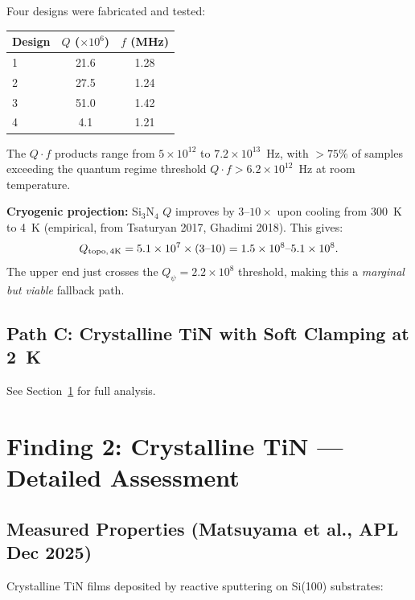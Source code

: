 \documentclass[11pt]{article}
\theoremstyle{definition}
\theoremstyle{remark}
\newcommand{\ee}[1]{\times 10^{#1}}
\newcommand{\Qpsi}{Q_\psi}
\begin{document}
Four designs were fabricated and tested:
\begin{center}
\begin{tabular}{lcc}
\toprule
Design & $Q$ ($\times 10^6$) & $f$ (MHz) \\
\midrule
1 & 21.6 & 1.28 \\
2 & 27.5 & 1.24 \\
3 & 51.0 & 1.42 \\
4 & 4.1 & 1.21 \\
\bottomrule
\end{tabular}
\end{center}

The $Q \cdot f$ products range from $5\ee{12}$ to $7.2\ee{13}$~Hz,
with $> 75\%$ of samples exceeding the quantum regime threshold
$Q \cdot f > 6.2\ee{12}$~Hz at room temperature.

\textbf{Cryogenic projection:} Si$_3$N$_4$ $Q$ improves by
$3$--$10\times$ upon cooling from 300~K to 4~K (empirical, from
Tsaturyan 2017, Ghadimi 2018). This gives:
\begin{equation}
Q_{\rm topo,\,4K} = 5.1\ee{7} \times (3\text{--}10) =
1.5\ee{8}\text{--}5.1\ee{8}.
\end{equation}
The upper end just crosses the $\Qpsi = 2.2\ee{8}$ threshold,
making this a \textit{marginal but viable} fallback path.

\subsection{Path C: Crystalline TiN with Soft Clamping at 2~K}

See Section~\ref{sec:tin_detail} for full analysis.


\section{Finding 2: Crystalline TiN --- Detailed Assessment}
\label{sec:tin_detail}

\subsection{Measured Properties (Matsuyama et al., APL Dec 2025)}

Crystalline TiN films deposited by reactive sputtering on Si(100)
substrates:
\end{document}
